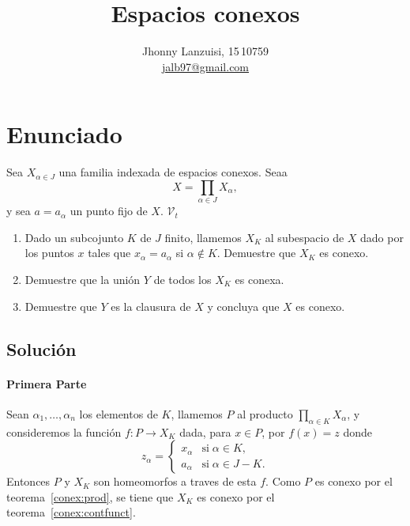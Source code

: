 \documentclass[fleqn,leqno,letterpaper,11pt,final]{article}
\title{Espacios conexos}
\author{Jhonny Lanzuisi, 15\,10759\\\url{jalb97@gmail.com}}
\begin{document}
\maketitle
\tableofcontents	
	

\section[Enunciado]{Enunciado}

\hspace{-.6em}\footnotemark Sea $X_{\alpha\in J}$ una familia indexada de espacios conexos. Seaa
\[
	X=\prod_{\alpha\in J} X_\alpha,
\]
y sea $a=a_\alpha$ un punto fijo de $X$. $\mathcal{V}_t$
\begin{enumerate}
	\item Dado un subcojunto $K$ de $J$ finito, llamemos $X_K$ al subespacio de $X$ dado por los puntos
		$x$ tales que $x_\alpha=a_\alpha$ si $\alpha\not\in K$. Demuestre que $X_K$ es conexo.
	\item Demuestre que la unión $Y$ de todos los $X_K$ es conexa.
	\item Demuestre que $Y$ es la clausura de $X$ y concluya que $X$ es conexo.
\end{enumerate}

\subsection{Solución}
\paragraph{Primera Parte}
Sean $\alpha_1,\dots,\alpha_n$ los elementos de $K$, llamemos $P$ al producto $\prod_{\alpha\in K}X_\alpha$,
y consideremos la función 
$f:P\to X_K$ dada, para $x\in P$, por $f(x)=z$ donde
\[
	z_\alpha= \begin{cases}
		x_\alpha &\text{si}\; \alpha\in K,\\
		a_\alpha &\text{si}\; \alpha\in J-K.
	\end{cases}
\]
Entonces $P$ y $X_K$ son homeomorfos a traves de esta $f$. Como $P$ es conexo por
el teorema~\ref{conex:prod}, se tiene que $X_K$ es conexo por el teorema~\ref{conex:contfunct}.
\end{document}
